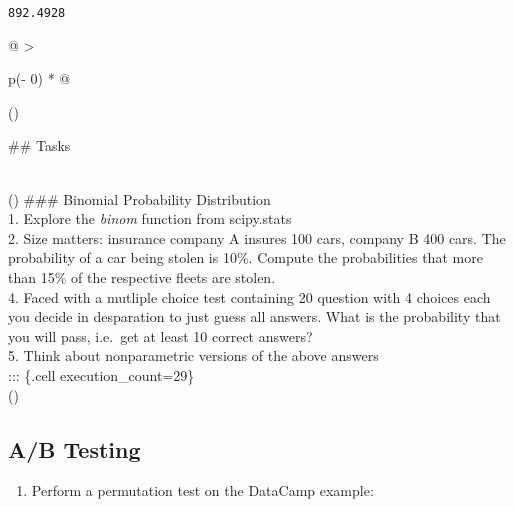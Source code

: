 \documentclass[
  letterpaper,
  DIV=11,
  numbers=noendperiod]{scrreprt}
\providecommand{\tightlist}{%
  \setlength{\itemsep}{0pt}\setlength{\parskip}{0pt}}\usepackage{longtable,booktabs,array}
\begin{document}
\begin{verbatim}
892.4928
\end{verbatim}

\begin{longtable}[]{@{}
  >{\raggedright\arraybackslash}p{(\columnwidth - 0\tabcolsep) * }@{}}
\toprule()
\begin{minipage}[b]{\linewidth}\raggedright
\#\# Tasks
\end{minipage} \\
\midrule()
\endhead
\#\#\# Binomial Probability Distribution \\
1. Explore the \emph{binom} function from scipy.stats \\
2. Size matters: insurance company A insures 100 cars, company B 400
cars. The probability of a car being stolen is 10\%. Compute the
probabilities that more than 15\% of the respective fleets are
stolen. \\
4. Faced with a mutliple choice test containing 20 question with 4
choices each you decide in desparation to just guess all answers. What
is the probability that you will pass, i.e.~get at least 10 correct
answers? \\
5. Think about nonparametric versions of the above answers \\
::: \{.cell execution\_count=29\} \\
\bottomrule()
\end{longtable}

\hypertarget{ab-testing-2}{%
\subsection{A/B Testing}\label{ab-testing-2}}

\begin{enumerate}
\def\labelenumi{\arabic{enumi}.}
\tightlist
\item
  Perform a permutation test on the DataCamp example:
\end{enumerate}
\end{document}
